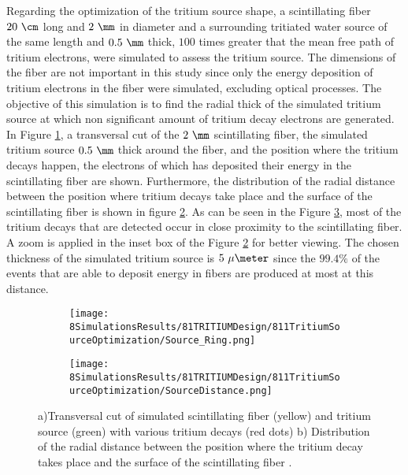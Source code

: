Regarding the optimization of the tritium source shape, a scintillating fiber $20~\cm$ long and $2~\mm$ in diameter and a surrounding tritiated water source of the same length and $0.5~\mm$ thick, $100$ times greater that the mean free path of tritium electrons, were simulated to assess the tritium source. The dimensions of the fiber are not important in this study since only the energy deposition of tritium electrons in the fiber were simulated, excluding optical processes. The objective of this simulation is to find the radial thick of the simulated tritium source at which non significant amount of tritium decay electrons are generated. In Figure \ref{subfig:TransversalCutTritiumSource}, a transversal cut of the $2~\mm$ scintillating fiber, the simulated tritium source $0.5~\mm$ thick around the fiber, and the position where the tritium decays happen, the electrons of which has deposited their energy in the scintillating fiber are shown. Furthermore, the distribution of the radial distance between the position where tritium decays take place and the surface of the scintillating fiber is shown in figure \ref{subfig:DistanceDistributionTritiumSourceFiber}. As can be seen in the Figure \ref{fig:TritiumSourceSimulated}, most of the tritium decays that are detected occur in close proximity to the scintillating fiber.  A zoom is applied in the inset box of the Figure \ref{subfig:DistanceDistributionTritiumSourceFiber} for better viewing. The chosen thickness of the simulated tritium source is $5~\mu\meter$ since the $99.4\%$ of the events that are able to deposit energy in fibers are produced at most at this distance.

\begin{figure}
\centering
    \begin{subfigure}[b]{0.45\textwidth}
    \centering
    \texttt{[image: 8SimulationsResults/81TRITIUMDesign/811TritiumSourceOptimization/Source\_Ring.png]}  
    \caption{\label{subfig:TransversalCutTritiumSource}}
    \end{subfigure}
    \hfill
    \begin{subfigure}[b]{0.45\textwidth}
    \centering
    \texttt{[image: 8SimulationsResults/81TRITIUMDesign/811TritiumSourceOptimization/SourceDistance.png]}  
    \caption{\label{subfig:DistanceDistributionTritiumSourceFiber}}
    \end{subfigure}
 \caption{a)Transversal cut of simulated scintillating fiber (yellow) and tritium source (green) with various tritium decays (red dots) b) Distribution of the radial distance between the position where the tritium decay takes place and the surface of the scintillating fiber \cite{SimulationPaperCarlos}.}
 \label{fig:TritiumSourceSimulated}
\end{figure}	

